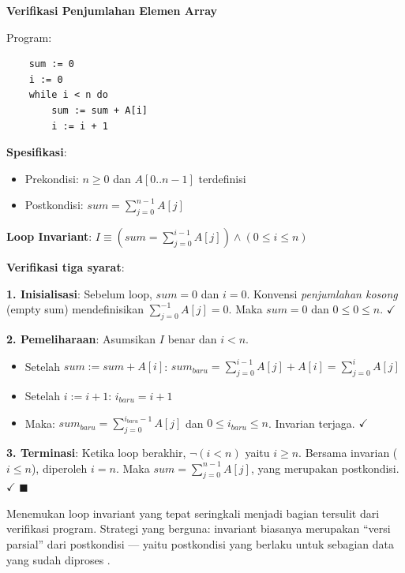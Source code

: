 \begin{contoh}
\textbf{Verifikasi Penjumlahan Elemen Array}

Program:
\begin{verbatim}
    sum := 0
    i := 0
    while i < n do
        sum := sum + A[i]
        i := i + 1
\end{verbatim}

\textbf{Spesifikasi}:
\begin{itemize}
    \item Prekondisi: $n \geq 0$ dan $A[0..n-1]$ terdefinisi
    \item Postkondisi: $sum = \sum_{j=0}^{n-1} A[j]$
\end{itemize}

\textbf{Loop Invariant}: $I \equiv \left(sum = \sum_{j=0}^{i-1} A[j]\right) \wedge (0 \leq i \leq n)$

\textbf{Verifikasi tiga syarat}:

\textbf{1. Inisialisasi}: Sebelum loop, $sum = 0$ dan $i = 0$. Konvensi \textit{penjumlahan kosong} (empty sum) mendefinisikan $\sum_{j=0}^{-1} A[j] = 0$. Maka $sum = 0$ dan $0 \leq 0 \leq n$. $\checkmark$

\textbf{2. Pemeliharaan}: Asumsikan $I$ benar dan $i < n$.
\begin{itemize}
    \item Setelah $sum := sum + A[i]$: $sum_{baru} = \sum_{j=0}^{i-1} A[j] + A[i] = \sum_{j=0}^{i} A[j]$
    \item Setelah $i := i + 1$: $i_{baru} = i + 1$
    \item Maka: $sum_{baru} = \sum_{j=0}^{i_{baru}-1} A[j]$ dan $0 \leq i_{baru} \leq n$. Invarian terjaga. $\checkmark$
\end{itemize}

\textbf{3. Terminasi}: Ketika loop berakhir, $\neg(i < n)$ yaitu $i \geq n$. Bersama invarian ($i \leq n$), diperoleh $i = n$. Maka $sum = \sum_{j=0}^{n-1} A[j]$, yang merupakan postkondisi. $\checkmark$ $\blacksquare$
\end{contoh}

\begin{catatan}
Menemukan loop invariant yang tepat seringkali menjadi bagian tersulit dari verifikasi program. Strategi yang berguna: invariant biasanya merupakan ``versi parsial'' dari postkondisi --- yaitu postkondisi yang berlaku untuk sebagian data yang sudah diproses \cite{wiki_loop_invariant}.
\end{catatan}
